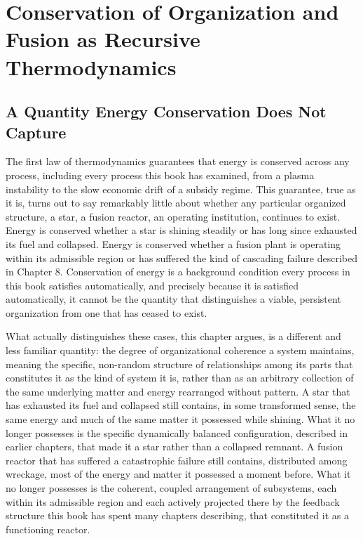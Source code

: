 \chapter{Conservation of Organization and Fusion as Recursive Thermodynamics}

\section{A Quantity Energy Conservation Does Not Capture}

The first law of thermodynamics guarantees that energy is conserved across any process, including every process this book has examined, from a plasma instability to the slow economic drift of a subsidy regime. This guarantee, true as it is, turns out to say remarkably little about whether any particular organized structure, a star, a fusion reactor, an operating institution, continues to exist. Energy is conserved whether a star is shining steadily or has long since exhausted its fuel and collapsed. Energy is conserved whether a fusion plant is operating within its admissible region or has suffered the kind of cascading failure described in Chapter 8. Conservation of energy is a background condition every process in this book satisfies automatically, and precisely because it is satisfied automatically, it cannot be the quantity that distinguishes a viable, persistent organization from one that has ceased to exist.

What actually distinguishes these cases, this chapter argues, is a different and less familiar quantity: the degree of organizational coherence a system maintains, meaning the specific, non-random structure of relationships among its parts that constitutes it as the kind of system it is, rather than as an arbitrary collection of the same underlying matter and energy rearranged without pattern. A star that has exhausted its fuel and collapsed still contains, in some transformed sense, the same energy and much of the same matter it possessed while shining. What it no longer possesses is the specific dynamically balanced configuration, described in earlier chapters, that made it a star rather than a collapsed remnant. A fusion reactor that has suffered a catastrophic failure still contains, distributed among wreckage, most of the energy and matter it possessed a moment before. What it no longer possesses is the coherent, coupled arrangement of subsystems, each within its admissible region and each actively projected there by the feedback structure this book has spent many chapters describing, that constituted it as a functioning reactor.

